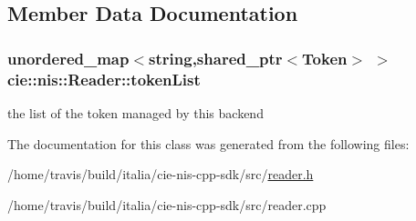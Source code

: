 \subsection{Member Data Documentation}
\hypertarget{classcie_1_1nis_1_1Reader_ad94db6ba461e4f00d53488c4863cda20}{
\subsubsection[{token\-List}]{\setlength{\rightskip}{0pt plus 5cm}unordered\-\_\-map$<$string,shared\-\_\-ptr$<${\bf Token}$>$ $>$ cie\-::nis\-::\-Reader\-::token\-List\hspace{0.3cm}{\ttfamily [protected]}}}\label{classcie_1_1nis_1_1Reader_ad94db6ba461e4f00d53488c4863cda20}
the list of the token managed by this backend 

The documentation for this class was generated from the following files\-:\begin{DoxyCompactItemize}
\item 
/home/travis/build/italia/cie-\/nis-\/cpp-\/sdk/src/\hyperlink{reader_8h}{reader.\-h}\item 
/home/travis/build/italia/cie-\/nis-\/cpp-\/sdk/src/reader.\-cpp\end{DoxyCompactItemize}
